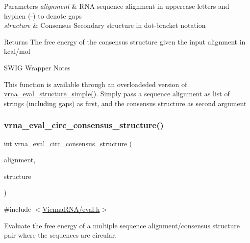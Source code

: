 \begin{DoxyParams}{Parameters}
{\em alignment} & R\+NA sequence alignment in uppercase letters and hyphen (\textquotesingle{}-\/\textquotesingle{}) to denote gaps \\
\hline
{\em structure} & Consensus Secondary structure in dot-\/bracket notation \\
\hline
\end{DoxyParams}
\begin{DoxyReturn}{Returns}
The free energy of the consensus structure given the input alignment in kcal/mol
\end{DoxyReturn}
\begin{DoxyRefDesc}{S\+W\+I\+G Wrapper Notes}
\item[\hyperlink{wrappers__wrappers000039}{S\+W\+I\+G Wrapper Notes}]This function is available through an overloadeded version of \hyperlink{group__eval_ga7e5273464b775d4130245681312c1369}{vrna\+\_\+eval\+\_\+structure\+\_\+simple()}. Simply pass a sequence alignment as list of strings (including gaps) as first, and the consensus structure as second argument \end{DoxyRefDesc}
\mbox{\label{group__eval_gac96577cf232c71160f762737a994b7c6}} 
\subsubsection{\texorpdfstring{vrna\+\_\+eval\+\_\+circ\+\_\+consensus\+\_\+structure()}{vrna\_eval\_circ\_consensus\_structure()}}
{\footnotesize\ttfamily int vrna\+\_\+eval\+\_\+circ\+\_\+consensus\+\_\+structure (\begin{DoxyParamCaption}\item[{const char $\ast$$\ast$}]{alignment,  }\item[{const char $\ast$}]{structure }\end{DoxyParamCaption})}



{\ttfamily \#include $<$\hyperlink{eval_8h}{Vienna\+R\+N\+A/eval.\+h}$>$}



Evaluate the free energy of a multiple sequence alignment/consensus structure pair where the sequences are circular. 

